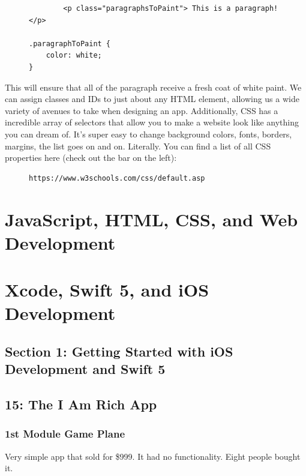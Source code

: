 \documentclass[11pt, letterpaper]{article}
\begin{document}
\begin{figure}
\centering
\begin{BVerbatim}
        <p class="paragraphsToPaint"> This is a paragraph! </p>

.paragraphToPaint {
    color: white;
}
\end{BVerbatim}
\end{figure}

This will ensure that all of the paragraph receive a fresh coat of white paint. We can assign classes and IDs to just
about any HTML element, allowing us a wide variety of avenues to take when designing an app. Additionally, CSS has a
incredible array of selectors that allow you to make a website look like anything you can dream of. It's super easy
to change background colors, fonts, borders, margins, the list goes on and on. Literally. You can find a list of
all CSS properties here (check out the bar on the left):

\begin{figure}[ht]
\centering
\begin{BVerbatim}
https://www.w3schools.com/css/default.asp
\end{BVerbatim}
\end{figure}

\section{JavaScript, HTML, CSS, and Web Development}

\section{Xcode, Swift 5, and iOS Development}

\subsection*{Section 1: Getting Started with iOS Development and Swift 5}

\subsection*{15: The I Am Rich App}

\subsubsection*{1st Module Game Plane}

Very simple app that sold for \$999. It had no functionality. Eight people bought it. \\
\end{document}
